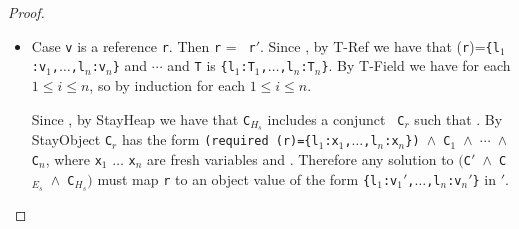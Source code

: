\begin{proof}
\begin{itemize}
\begin{itemize}
Therefore in either case, there must be some constraint on an l-value
{\tt L$''$} in {\tt C}, where
 but
.
By Lemma~\ref{lem:valueImpliesType} there is some {\tt T$''$} such
that 
and .  The last rule in the derivation of
 must be {\sc T-Const} so {\tt T$''$}
is {\tt PrimitiveType}.
We argue a contradiction by case analysis of the immediate parent
expression of any occurrence of {\tt L$''$} in {\tt C}.  We are given  so this parent
expression must also be well typed.
  \begin{itemize}
   \item Case {\tt L$''$.l}.  Then by {\sc T-Field} {\tt L$''$} must have a
     record type, contradicting the fact that .
  \item Case {\tt L$''$} is an immediate subexpression of an $\oplus$
 operation.  But these operations only
    apply to primitives, so the solver cannot satisfy them by
    assigning {\tt x} to {\tt r$'$}.
  \item Case {\tt $\rho$ L$''$}.  This constraint is only satisfied if
    {\tt x} is a boolean, so the solver will not assign {\tt x} to
    {\tt r$'$}.
  \end{itemize}

  \end{itemize}

\item Case {\tt v} is a reference {\tt r}.  Then {\tt r} = {\tt
    r$'$}.  Since , by {\sc T-Ref} we have
  that \texttt{\Huid}(\texttt{r})=\texttt{\{l$_1$:v$_1$,$\ldots$,l$_n$:v$_n$\}}
    and
   $\cdots$
   and {\tt T} is
  \texttt{\{l$_1$:T$_1$,$\ldots$,l$_n$:T$_n$\}}.  By {\sc T-Field} we
  have  for each $1 \leq i \leq n$,
  so by induction  for each $1
  \leq i \leq n$.

 Since , by
  {\sc StayHeap} we have that {\tt C$_{H_s}$} includes a conjunct {\tt
    C$_r$} such that .
By {\sc StayObject} {\tt C$_r$} has the form {\tt (required \Deref(r)=\{l$_1$:x$_1$,$\ldots$,l$_n$:x$_n$\}) $\wedge$
    C$_{1}$ $\wedge$
    $\cdots$ $\wedge$
    C$_{n}$}, where {\tt x$_1$} $\ldots$ {\tt x$_n$} are fresh
  variables and .  Therefore any solution to {\tt $($C$'$ $\wedge$ C$_{E_s}$ $\wedge$
      C$_{H_s}$$)$} must map {\tt r} to an object value of the form
    {\tt  \{l$_1$:v$_1'$,$\ldots$,l$_n$:v$_n'$\}} in {\tt \Huid$'$}.
    

\end{itemize}
\end{proof}
